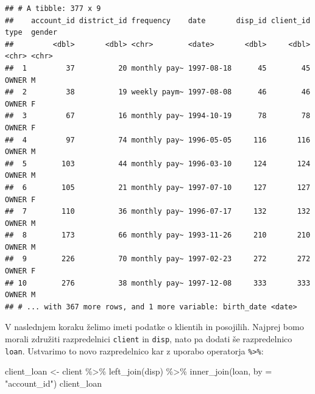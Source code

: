 \documentclass[
]{book}
\newenvironment{Shaded}{\begin{snugshade}}{\end{snugshade}}
\newcommand{\AttributeTok}[1]{\textcolor[rgb]{0.77,0.63,0.00}{#1}}
\newcommand{\FunctionTok}[1]{\textcolor[rgb]{0.00,0.00,0.00}{#1}}
\newcommand{\NormalTok}[1]{#1}
\newcommand{\OtherTok}[1]{\textcolor[rgb]{0.56,0.35,0.01}{#1}}
\newcommand{\SpecialCharTok}[1]{\textcolor[rgb]{0.00,0.00,0.00}{#1}}
\newcommand{\StringTok}[1]{\textcolor[rgb]{0.31,0.60,0.02}{#1}}
\begin{document}
\begin{verbatim}
## # A tibble: 377 x 9
##    account_id district_id frequency    date       disp_id client_id type  gender
##         <dbl>       <dbl> <chr>        <date>       <dbl>     <dbl> <chr> <chr> 
##  1         37          20 monthly pay~ 1997-08-18      45        45 OWNER M     
##  2         38          19 weekly paym~ 1997-08-08      46        46 OWNER F     
##  3         67          16 monthly pay~ 1994-10-19      78        78 OWNER F     
##  4         97          74 monthly pay~ 1996-05-05     116       116 OWNER M     
##  5        103          44 monthly pay~ 1996-03-10     124       124 OWNER M     
##  6        105          21 monthly pay~ 1997-07-10     127       127 OWNER F     
##  7        110          36 monthly pay~ 1996-07-17     132       132 OWNER M     
##  8        173          66 monthly pay~ 1993-11-26     210       210 OWNER M     
##  9        226          70 monthly pay~ 1997-02-23     272       272 OWNER F     
## 10        276          38 monthly pay~ 1997-12-08     333       333 OWNER M     
## # ... with 367 more rows, and 1 more variable: birth_date <date>
\end{verbatim}

V naslednjem koraku želimo imeti podatke o klientih in posojilih. Najprej bomo morali združiti razpredelnici \texttt{client} in \texttt{disp}, nato pa dodati še razpredelnico \texttt{loan}. Ustvarimo to novo razpredelnico kar z uporabo operatorja \texttt{\%\textgreater{}\%}:

\begin{Shaded}
\begin{Highlighting}[]
\NormalTok{client\_loan }\OtherTok{\textless{}{-}}\NormalTok{ client }\SpecialCharTok{\%\textgreater{}\%}
  \FunctionTok{left\_join}\NormalTok{(disp) }\SpecialCharTok{\%\textgreater{}\%}
  \FunctionTok{inner\_join}\NormalTok{(loan, }\AttributeTok{by =} \StringTok{"account\_id"}\NormalTok{)}
\NormalTok{client\_loan}
\end{Highlighting}
\end{Shaded}
\end{document}

